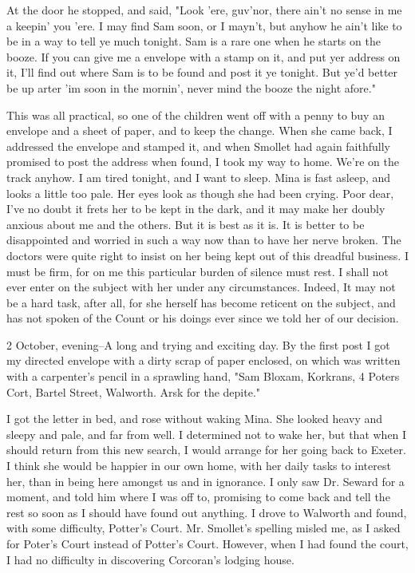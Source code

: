 At the door he stopped, and said, "Look 'ere, guv'nor, there ain't no sense in me a keepin' you 'ere. I may find Sam soon, or I mayn't, but anyhow he ain't like to be in a way to tell ye much tonight. Sam is a rare one when he starts on the booze. If you can give me a envelope with a stamp on it, and put yer address on it, I'll find out where Sam is to be found and post it ye tonight. But ye'd better be up arter 'im soon in the mornin', never mind the booze the night afore." 

This was all practical, so one of the children went off with a penny to buy an envelope and a sheet of paper, and to keep the change. When she came back, I addressed the envelope and stamped it, and when Smollet had again faithfully promised to post the address when found, I took my way to home. We're on the track anyhow. I am tired tonight, and I want to sleep. Mina is fast asleep, and looks a little too pale. Her eyes look as though she had been crying. Poor dear, I've no doubt it frets her to be kept in the dark, and it may make her doubly anxious about me and the others. But it is best as it is. It is better to be disappointed and worried in such a way now than to have her nerve broken. The doctors were quite right to insist on her being kept out of this dreadful business. I must be firm, for on me this particular burden of silence must rest. I shall not ever enter on the subject with her under any circumstances. Indeed, It may not be a hard task, after all, for she herself has become reticent on the subject, and has not spoken of the Count or his doings ever since we told her of our decision. 

2 October, evening--A long and trying and exciting day. By the first post I got my directed envelope with a dirty scrap of paper enclosed, on which was written with a carpenter's pencil in a sprawling hand, "Sam Bloxam, Korkrans, 4 Poters Cort, Bartel Street, Walworth. Arsk for the depite." 

I got the letter in bed, and rose without waking Mina. She looked heavy and sleepy and pale, and far from well. I determined not to wake her, but that when I should return from this new search, I would arrange for her going back to Exeter. I think she would be happier in our own home, with her daily tasks to interest her, than in being here amongst us and in ignorance. I only saw Dr. Seward for a moment, and told him where I was off to, promising to come back and tell the rest so soon as I should have found out anything. I drove to Walworth and found, with some difficulty, Potter's Court. Mr. Smollet's spelling misled me, as I asked for Poter's Court instead of Potter's Court. However, when I had found the court, I had no difficulty in discovering Corcoran's lodging house. 

